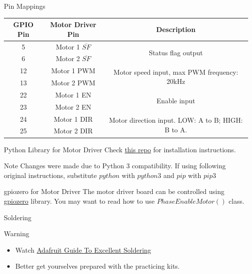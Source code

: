 \documentclass[12pt,letterpaper]{beamer}
\begin{document}
\begin{frame}{Pin Mappings}
    \begin{tabular}{ ccc }
        \hline
        GPIO Pin & Motor Driver Pin & Description \\
        \hline
        5  & Motor 1 $\overline{SF}$  & \multirow{2}{12em}{\scriptsize Status flag output}  \\
        6  & Motor 2 $\overline{SF}$  &  \\
        \hline
        12  & Motor 1 PWM  & \multirow{2}{12em}{\scriptsize Motor speed input, max PWM frequency: 20kHz}  \\
        13  & Motor 2 PWM  &  \\
        \hline
        22  & Motor 1 EN  & \multirow{2}{12em}{\scriptsize Enable input}  \\
        23  & Motor 2 EN  &  \\
        \hline
        24  & Motor 1 DIR  & \multirow{2}{12em}{\scriptsize Motor direction input. LOW: A to B; HIGH: B to A.}  \\
        25  & Motor 2 DIR  &  \\
        \hline
    \end{tabular}
\end{frame}

\begin{frame}{Python Library for Motor Driver}
    Check \href{https://github.com/linzhangUCA/dual-mc33926-motor-driver-rpi}{this repo} for installation instructions.
    \begin{block}{Note}
        Changes were made due to Python 3 compatibility. If using following original instructions, substitute $python$ with $python3$ and $pip$ with $pip3$
    \end{block}
\end{frame}

\begin{frame}{gpiozero for Motor Driver}
    The motor driver board can be controlled using \href{https://gpiozero.readthedocs.io/en/stable/api_output.html}{gpiozero} library. You may want to read how to use $PhaseEnableMotor()$ class.
\end{frame}

\begin{frame}{Soldering}
    \begin{alertblock}{Warning}
        \begin{itemize}
            \item Watch \href{https://learn.adafruit.com/adafruit-guide-excellent-soldering}{Adafruit Guide To Excellent Soldering}
            \item Better get yourselves prepared with the practicing kits.
        \end{itemize}
    \end{alertblock}
\end{frame}
\end{document}
